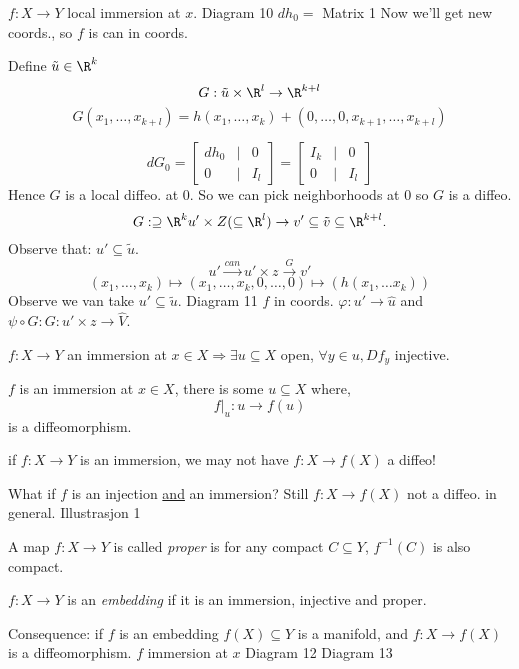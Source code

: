 \begin{theorem}
    $f: X \to Y$ local immersion at $x$.
    \newline Diagram 10
    \newline $dh_0=$ Matrix 1
    \newline Now we'll get new coords., so $f$ is can in coords.
\end{theorem}
\begin{definition}
  Define $\tilde{u}\in \R^k$
    $$G: \tilde{u}\times \R^l\to \R^{k+l}$$
    $$G(x_1,\dots,x_{k+l})=h(x_1,\dots,x_k)+(0,\dots,0,x_{k+1},\dots,x_{k+l})$$
\end{definition}
$$dG_0=
\begin{bmatrix}
dh_0 &|& 0 \\
0 & | & I_l
\end{bmatrix}=
\begin{bmatrix}
I_k &|& 0 \\
0 &|& I_l
\end{bmatrix}
$$
Hence $G$ is a local diffeo. at $0$. So we can pick neighborhoods at $0$ so $G$ is a diffeo.
  $$G:\supseteq \R^k u'  \times Z (\subseteq \R^l ) \to v'\subseteq \tilde{v}\subseteq \R^{k+l}.$$
Observe that: $u'\subseteq \tilde{u}$.
  $$u' \xrightarrow{can }u'\times z \xrightarrow{G}v'$$
  $$(x_1,\dots,x_k)\mapsto (x_1,\dots,x_k,0,\dots,0)\mapsto (h(x_1,\dots x_k))$$
Observe we van take $u'\subseteq \tilde{u}$.
\newline Diagram 11
\newline $f$ in coords. $\varphi : u'\to \hat{u}$ and $\psi \circ G:G:u'\times z \to \hat{V}$.
\begin{corollary}
  $f: X \to Y$ an immersion at $x\in X \Rightarrow \exists u\subseteq X$ open,
      $\forall y \in u, Df_y$ injective.
\end{corollary}
\begin{corollary}
  $f$ is an immersion at $x\in X$, there is some $u \subseteq X$ where,
    $$f\rvert_{u}:u\to f(u)$$
  is a diffeomorphism.
\end{corollary}

\begin{remark}
  if $f: X \to Y$ is an immersion, we may not have $f: X \to f(X)$ a diffeo!
\end{remark}
What if $f$ is an injection \underline{and} an immersion? Still $f: X \to f(X)$ not a diffeo. in general.
\newline Illustrasjon 1
\begin{definition}
  A map $f: X \to Y$ is called \emph{proper} is for any compact $C \subseteq Y$, $f ^{-1}(C)$ is also compact.
\end{definition}
\begin{definition}
  $f: X \to Y$ is an \emph{embedding} if it is an immersion, injective and proper.
\end{definition}
Consequence: if $f$ is an embedding
  \newline $f(X)\subseteq Y$ is a manifold, and $f: X \to f(X)$ is a diffeomorphism.
\newline $f$ immersion at $x$
\newline Diagram 12
\newline Diagram 13


